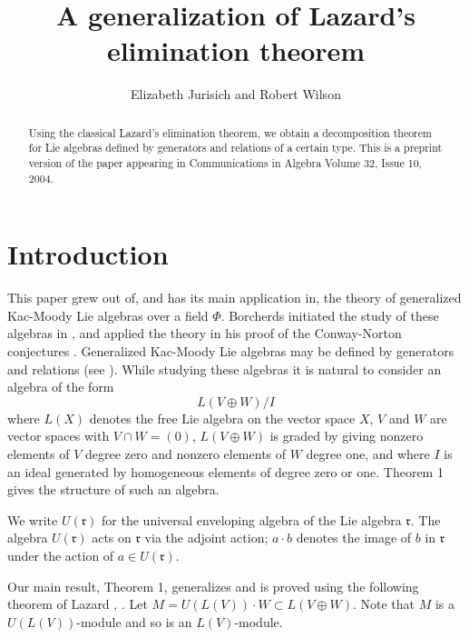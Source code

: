 \documentclass[11pt]{amsart}
\title{A generalization of Lazard's elimination theorem}
\author{Elizabeth Jurisich  and Robert Wilson }
\theoremstyle{definition}
\renewcommand{\frak}{\mathfrak}
\begin{document}
\maketitle

\begin{abstract}Using the classical Lazard's elimination theorem,
we obtain a decomposition theorem for Lie algebras defined by
generators and relations of a certain type. This is a preprint version of the paper appearing in Communications in Algebra Volume 32, Issue 10, 2004. 
\end{abstract}

\section{Introduction}

This paper grew out of, and has its main application in, the
theory of generalized Kac-Moody Lie algebras over a field $\Phi$. Borcherds 
initiated the study of these algebras in \cite{2}, and applied the
theory in his proof of the Conway-Norton conjectures \cite{3}. 
Generalized Kac-Moody Lie algebras may be defined by generators and
relations (see \cite{7}).  
While studying these algebras it is natural to consider an algebra of the
form $$L(V \oplus W)/I$$
where $L(X)$ denotes the free Lie algebra on the vector space $X$, $V$
and $W$ are vector spaces with $V \cap W = (0)$, $L(V \oplus W)$ is
graded by giving nonzero elements of $V$ degree zero and nonzero
elements of $W$ degree
one, and where $I$ is an ideal generated by homogeneous elements of
degree zero or one. Theorem 1 gives the structure of
such an algebra.

We write $U(\frak r)$ for the universal enveloping algebra of the Lie 
algebra $\frak r$. The algebra $U(\frak r)$ acts on $\frak r$ via the
adjoint action; $ a \cdot b$ denotes the image of $b$ in $\frak r$
under the action of $a \in U(\frak r)$.

Our main result, Theorem 1, generalizes and is proved using the
following theorem of 
Lazard \cite{10}, \cite[Proposition 10]{4}. 
Let $M = U(L(V))\cdot W \subset L(V \oplus W)$.
Note that $M$ is a $U(L(V))$-module and so is an $L(V)$-module.
\end{document}
